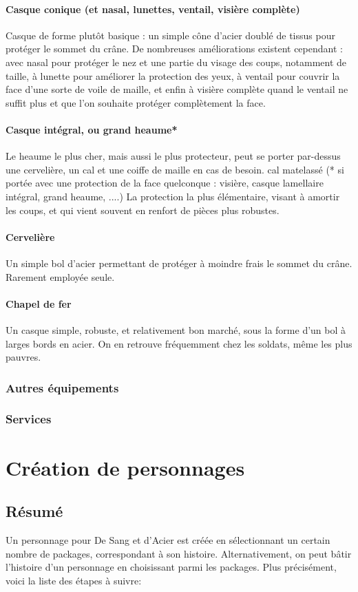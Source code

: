 \documentclass[10pt,a4paper,twocolumn]{book}
\begin{document}
\subsubsection{Casque conique (et nasal, lunettes, ventail, visière complète)}
Casque de forme plutôt basique : un simple cône d'acier doublé de tissus pour protéger le sommet du crâne. De nombreuses améliorations existent cependant : avec nasal pour protéger le nez et une partie du visage des coups, notamment de taille, à lunette pour améliorer la protection des yeux, à ventail pour couvrir la face d'une sorte de voile de maille, et enfin à visière complète quand le ventail ne suffit plus et que l'on souhaite protéger complètement la face.
\subsubsection{Casque intégral, ou grand heaume*}
Le heaume le plus cher, mais aussi le plus protecteur, peut se porter par-dessus une cervelière, un cal et une coiffe de maille en cas de besoin.
cal matelassé
(* si portée avec une protection de la face quelconque : visière, casque lamellaire intégral, grand heaume, ....)
La protection la plus élémentaire, visant à amortir les coups, et qui vient souvent en renfort de pièces plus robustes.
\subsubsection{Cervelière}
Un simple bol d'acier permettant de protéger à moindre frais le sommet du crâne. Rarement employée seule.
\subsubsection{Chapel de fer}
Un casque simple, robuste, et relativement bon marché, sous la forme d'un bol à larges bords en acier. On en retrouve fréquemment chez les soldats, même les plus pauvres.
\subsection{Autres équipements}
\subsection{Services}

\chapter{Création de personnages}
\section{Résumé}
Un personnage pour De Sang et d’Acier est créée en sélectionnant un certain nombre de packages, correspondant à son histoire. Alternativement, on peut bâtir l’histoire d’un personnage en choisissant parmi les packages.
Plus précisément, voici la liste des étapes à suivre:
\end{document}
